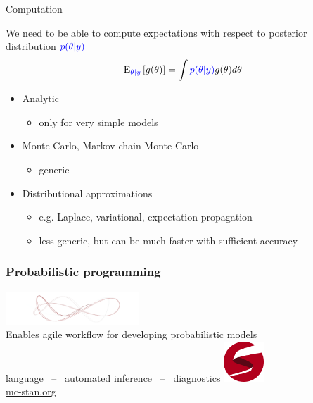 \documentclass[english,t]{beamer}
\newcommand{\E}{\mathrm{E}}
\begin{document}
\begin{frame}{Computation}

  We need to be able to compute expectations with respect to posterior
  distribution ${\color{blue}p(\theta|y)}$
  \begin{align*}
    \E_{\color{blue}{\theta|y}}\left[ g(\theta) \right] = \int {\color{blue}p(\theta|y)}g(\theta) d\theta
  \end{align*}
  
  \begin{itemize}
  \item Analytic
    \begin{itemize}
    \item only for very simple models
    \end{itemize}
  \item Monte Carlo, Markov chain Monte Carlo
    \begin{itemize}
    \item generic
    \end{itemize}
  \item Distributional approximations
    \begin{itemize}
    \item e.g. Laplace, variational, expectation propagation
    \item less generic, but can be much faster with sufficient accuracy
    \end{itemize}
  \end{itemize}
\end{frame}

\begin{frame}
  
  \frametitle{Probabilistic programming}
  
  \begin{center}
   \vspace{-\baselineskip}
    \includegraphics[width=5cm]{wide_ensemble.png}\\
   \vspace{2\baselineskip}
  {\large Enables agile workflow for developing probabilistic models}\\
   \vspace{\baselineskip}
   language \, -- \,
   automated inference \, -- \,
   diagnostics
   \vspace{\baselineskip}
  \vfill
    \includegraphics[width=1.5cm]{stan_logo_wide.png}\\
    \url{mc-stan.org}
  \end{center}

\end{frame}
\end{document}
